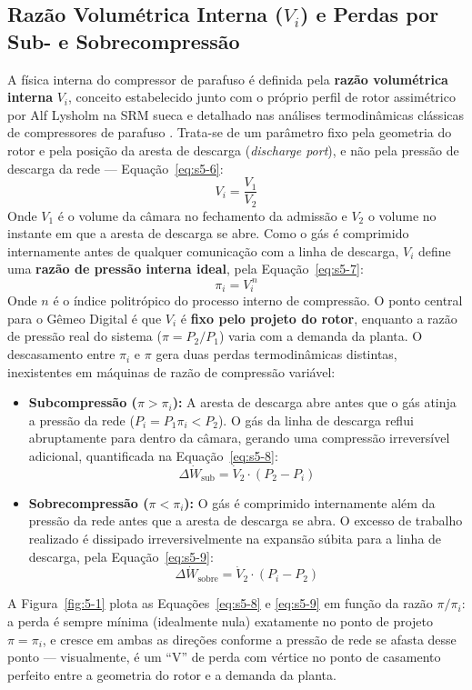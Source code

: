 \documentclass[12pt,a4paper]{article}
\numberwithin{equation}{section}
\numberwithin{table}{section}
\numberwithin{figure}{section}
\begin{document}
{	\subsection{\textbf{Razão Volumétrica Interna (\texorpdfstring{$V_i$}{Vi}) e Perdas por Sub- e Sobrecompressão}}
	A física interna do compressor de parafuso é definida pela \textbf{razão volumétrica interna} $V_i$, conceito estabelecido junto com o próprio perfil de rotor assimétrico por Alf Lysholm na SRM sueca \cite{lysholm} e detalhado nas análises termodinâmicas clássicas de compressores de parafuso \cite{fleming}. Trata-se de um parâmetro fixo pela geometria do rotor e pela posição da aresta de descarga (\textit{discharge port}), e não pela pressão de descarga da rede — Equação~\eqref{eq:s5-6}:
	\begin{equation}\label{eq:s5-6}
 V_i = \frac{V_1}{V_2} 
\end{equation}
	Onde $V_1$ é o volume da câmara no fechamento da admissão e $V_2$ o volume no instante em que a aresta de descarga se abre. Como o gás é comprimido internamente antes de qualquer comunicação com a linha de descarga, $V_i$ define uma \textbf{razão de pressão interna ideal}, pela Equação~\eqref{eq:s5-7}:
	\begin{equation}\label{eq:s5-7}
 \pi_i = V_i^{\,n} 
\end{equation}
	Onde $n$ é o índice politrópico do processo interno de compressão. O ponto central para o Gêmeo Digital é que $V_i$ é \textbf{fixo pelo projeto do rotor}, enquanto a razão de pressão real do sistema ($\pi = P_2/P_1$) varia com a demanda da planta. O descasamento entre $\pi_i$ e $\pi$ gera duas perdas termodinâmicas distintas, inexistentes em máquinas de razão de compressão variável:
	\begin{itemize}
		\item \textbf{Subcompressão ($\pi > \pi_i$):} A aresta de descarga abre antes que o gás atinja a pressão da rede ($P_i = P_1 \pi_i < P_2$). O gás da linha de descarga reflui abruptamente para dentro da câmara, gerando uma compressão irreversível adicional, quantificada na Equação~\eqref{eq:s5-8}:
		\begin{equation}\label{eq:s5-8}
 \Delta \dot{W}_{\text{sub}} = \dot{V}_2 \cdot (P_2 - P_i) 
\end{equation}
		\item \textbf{Sobrecompressão ($\pi < \pi_i$):} O gás é comprimido internamente além da pressão da rede antes que a aresta de descarga se abra. O excesso de trabalho realizado é dissipado irreversivelmente na expansão súbita para a linha de descarga, pela Equação~\eqref{eq:s5-9}:
		\begin{equation}\label{eq:s5-9}
 \Delta \dot{W}_{\text{sobre}} = \dot{V}_2 \cdot (P_i - P_2) 
\end{equation}
	\end{itemize}
	A Figura~\ref{fig:5-1} plota as Equações~\eqref{eq:s5-8} e \eqref{eq:s5-9} em função da razão $\pi/\pi_i$: a perda é sempre mínima (idealmente nula) exatamente no ponto de projeto $\pi=\pi_i$, e cresce em ambas as direções conforme a pressão de rede se afasta desse ponto — visualmente, é um ``V'' de perda com vértice no ponto de casamento perfeito entre a geometria do rotor e a demanda da planta.

}
\end{document}
